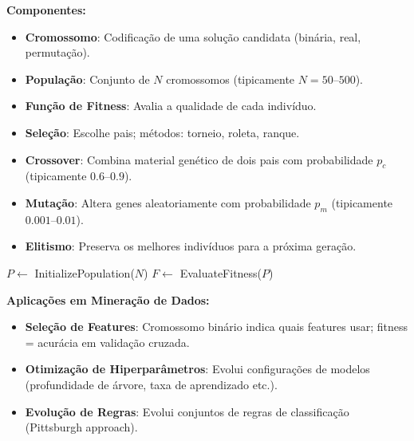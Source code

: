 \documentclass[12pt,a4paper]{article}
\begin{document}
\textbf{Componentes:}
\begin{itemize}
  \item \textbf{Cromossomo}: Codificação de uma solução candidata (binária, real, permutação).
  \item \textbf{População}: Conjunto de $N$ cromossomos (tipicamente $N = 50$--$500$).
  \item \textbf{Função de Fitness}: Avalia a qualidade de cada indivíduo.
  \item \textbf{Seleção}: Escolhe pais; métodos: torneio, roleta, ranque.
  \item \textbf{Crossover}: Combina material genético de dois pais com probabilidade $p_c$ (tipicamente $0.6$--$0.9$).
  \item \textbf{Mutação}: Altera genes aleatoriamente com probabilidade $p_m$ (tipicamente $0.001$--$0.01$).
  \item \textbf{Elitismo}: Preserva os melhores indivíduos para a próxima geração.
\end{itemize}

\begin{algorithm}[H]
\caption{Algoritmo Genético}
$P \leftarrow$ InitializePopulation($N$) 
$F \leftarrow$ EvaluateFitness($P$)\;
\;
\end{algorithm}

\textbf{Aplicações em Mineração de Dados:}
\begin{itemize}
  \item \textbf{Seleção de Features}: Cromossomo binário indica quais features usar; fitness = acurácia em validação cruzada.
  \item \textbf{Otimização de Hiperparâmetros}: Evolui configurações de modelos (profundidade de árvore, taxa de aprendizado etc.).
  \item \textbf{Evolução de Regras}: Evolui conjuntos de regras de classificação (Pittsburgh approach).
\end{itemize}
\end{document}
